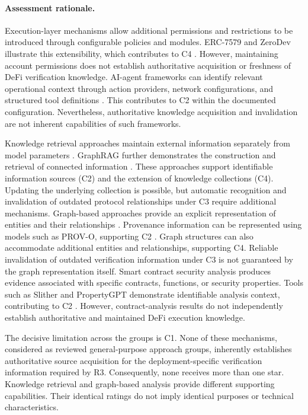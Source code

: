 \paragraph{Assessment rationale.}

Execution-layer mechanisms allow additional
permissions and restrictions to be introduced
through configurable policies and modules.
ERC-7579 and ZeroDev illustrate this extensibility,
which contributes to C4
\cite{erc7579MinimalModularSmartAccounts2023,
zeroDevPermissionPolicies2026}.
However, maintaining account permissions does
not establish authoritative acquisition or
freshness of DeFi verification knowledge. AI-agent frameworks can identify relevant
operational context through action providers,
network configurations, and structured tool
definitions \cite{coinbaseAgentKit2026}.
This contributes to C2 within the documented
configuration. Nevertheless, authoritative
knowledge acquisition and invalidation are not
inherent capabilities of such frameworks.

Knowledge retrieval approaches maintain
external information separately from model
parameters \cite{lewisRetrievalAugmentedGeneration2020}.
GraphRAG further demonstrates the construction
and retrieval of connected information
\cite{edgeGraphRAG2024}.
These approaches support identifiable information
sources (C2) and the extension of knowledge
collections (C4). Updating the underlying
collection is possible, but automatic recognition
and invalidation of outdated protocol relationships
under C3 require additional mechanisms. Graph-based approaches provide an explicit
representation of entities and their relationships
\cite{hoganKnowledgeGraphs2021,
anglesPropertyGraphModel2018}.
Provenance information can be represented using
models such as PROV-O, supporting C2
\cite{w3cPROVO2013}. Graph structures can also
accommodate additional entities and relationships,
supporting C4. Reliable invalidation of outdated
verification information under C3 is not
guaranteed by the graph representation itself. Smart contract security analysis produces evidence
associated with specific contracts, functions,
or security properties. Tools such as Slither
and PropertyGPT demonstrate identifiable
analysis context, contributing to C2
\cite{feistSlither2019,liuPropertyGPT2025}.
However, contract-analysis results do not
independently establish authoritative and
maintained DeFi execution knowledge.

The decisive limitation across the groups is
C1. None of these mechanisms, considered as
reviewed general-purpose approach groups,
inherently establishes authoritative source
acquisition for the deployment-specific
verification information required by R3.
Consequently, none receives more than one star. Knowledge retrieval and graph-based analysis
provide different supporting capabilities.
Their identical ratings do not imply identical
purposes or technical characteristics.


